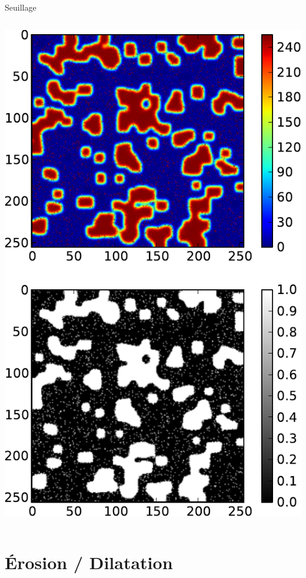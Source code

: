 \documentclass[8pt,a4paper]{beamer}
\begin{document}
\begin{frame}[containsverbatim]{Seuillage}
  \begin{columns}
  \includegraphics[width=\textwidth]{figures/seuillage.pdf} 
  
    \end{columns}
\end{frame}  

\section{Érosion / Dilatation}
\end{document}
